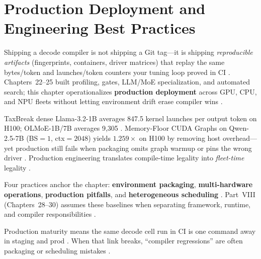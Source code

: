 \chapter{Production Deployment and Engineering Best Practices}
\label{chap:ch26}

Shipping a decode compiler is not shipping a Git tag---it is shipping \emph{reproducible artifacts} (fingerprints, containers, driver matrices) that replay the same bytes/token and launches/token counters your tuning loop proved in CI \citep{patel2025llminference,memoryfloor2026,taxbreak2026,chen2020compilerbasedhardw,yirage2026}. Chapters~22--25 built profiling, gates, LLM/MoE specialization, and automated search; this chapter operationalizes \textbf{production deployment} across GPU, CPU, and NPU fleets without letting environment drift erase compiler wins \citep{amd2024xdna,amd2024aie,dlbook,kwon2023vllm,liu2024deepseekv3}.

TaxBreak dense Llama-3.2-1B averages 847.5 kernel launches per output token on H100; OLMoE-1B/7B averages 9,305 \citep{taxbreak2026}. Memory-Floor CUDA Graphs on Qwen-2.5-7B (BS${=}1$, ctx${=}2048$) yields $1.259\times$ on H100 by removing host overhead---yet production still fails when packaging omits graph warmup or pins the wrong driver \citep{memoryfloor2026,nvidia2024cudagraphs}. Production engineering translates compile-time legality into \emph{fleet-time} legality \citep{yirage2026,chen2020compilerbasedhardw,patel2025llminference,kwon2023vllm,liu2024deepseekv3,amd2024aie,dlbook,semianalysis2024tma,amd2024xdna,dao2022flashattention,dao2023flashdecoding,nvidia2024cudagraphs,nvidia2022hopper}.

Four practices anchor the chapter: \textbf{environment packaging}, \textbf{multi-hardware operations}, \textbf{production pitfalls}, and \textbf{heterogeneous scheduling} \citep{patel2025llminference,chen2020compilerbasedhardw,yirage2026,amd2024xdna,amd2024aie,dlbook,kwon2023vllm,liu2024deepseekv3,memoryfloor2026,taxbreak2026,semianalysis2024tma,dao2022flashattention,dao2023flashdecoding,nvidia2024cudagraphs,nvidia2022hopper}. Part~VIII (Chapters~28--30) assumes these baselines when separating framework, runtime, and compiler responsibilities \citep{yirage2026,kwon2023vllm,patel2025llminference,chen2020compilerbasedhardw,liu2024deepseekv3,memoryfloor2026,taxbreak2026,amd2024aie,dlbook,semianalysis2024tma,amd2024xdna,dao2022flashattention,dao2023flashdecoding,nvidia2024cudagraphs,nvidia2022hopper}.

Production maturity means the same decode cell run in CI is one command away in staging and prod \citep{memoryfloor2026,taxbreak2026,patel2025llminference,yirage2026,chen2020compilerbasedhardw,kwon2023vllm,liu2024deepseekv3,amd2024aie,dlbook,semianalysis2024tma,amd2024xdna,dao2022flashattention,dao2023flashdecoding,nvidia2024cudagraphs,nvidia2022hopper}. When that link breaks, ``compiler regressions'' are often packaging or scheduling mistakes \citep{patel2025llminference,yirage2026,chen2020compilerbasedhardw,memoryfloor2026,taxbreak2026,kwon2023vllm,liu2024deepseekv3,amd2024aie,dlbook,semianalysis2024tma,amd2024xdna,dao2022flashattention,dao2023flashdecoding,nvidia2024cudagraphs,nvidia2022hopper}.

